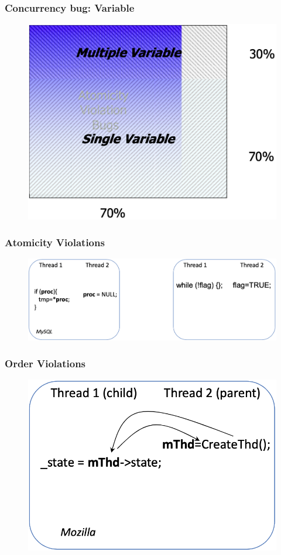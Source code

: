 % 
% 
% 
\begin{frame}[fragile]
    \frametitle{Concurrency bug: Variable}
    \begin{figure}
    \includegraphics[width=0.4\linewidth]{figs/root-cause-patterns-variable.png}
    \end{figure}
\end{frame}
% 
% 
\begin{frame}[fragile]
    \frametitle{Atomicity Violations}
    \begin{figure}
    \includegraphics[width=0.4\linewidth]{figs/atomic-region.png}
    \end{figure}
\end{frame}
% 
% 
% 
% 
\begin{frame}[fragile]
    \frametitle{Order Violations}
    \begin{figure}
    \includegraphics[width=0.4\linewidth]{figs/order-violation.png}
    \end{figure}
\end{frame}
